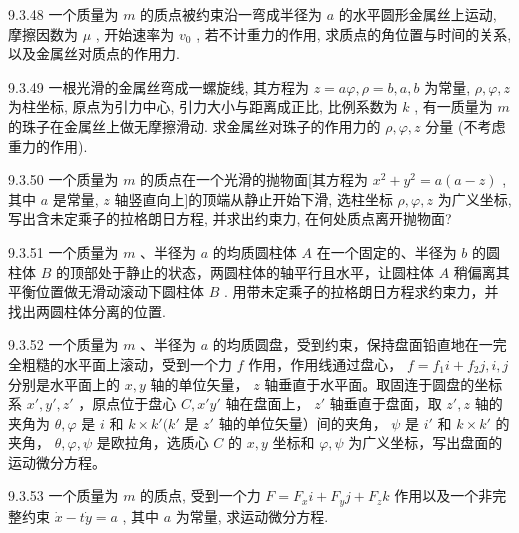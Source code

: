 \begin{problem}{9.3.48}
一个质量为 $m$ 的质点被约束沿一弯成半径为 $a$ 的水平圆形金属丝上运动, 摩擦因数为 $\mu$ , 开始速率为 $v_{0}$ , 若不计重力的作用, 求质点的角位置与时间的关系, 以及金属丝对质点的作用力.
\end{problem}
\clearpage


\begin{problem}{9.3.49}
一根光滑的金属丝弯成一螺旋线, 其方程为 $z = a\varphi, \rho = b, a, b$ 为常量, $\rho, \varphi, z$ 为柱坐标, 原点为引力中心, 引力大小与距离成正比, 比例系数为 $k$ , 有一质量为 $m$ 的珠子在金属丝上做无摩擦滑动. 求金属丝对珠子的作用力的 $\rho, \varphi, z$ 分量 (不考虑重力的作用).
\end{problem}
\clearpage


\begin{problem}{9.3.50}
一个质量为 $m$ 的质点在一个光滑的抛物面[其方程为 $x^{2} + y^{2} = a(a - z)$ , 其中 $a$ 是常量, $z$ 轴竖直向上]的顶端从静止开始下滑, 选柱坐标 $\rho, \varphi, z$ 为广义坐标, 写出含未定乘子的拉格朗日方程, 并求出约束力, 在何处质点离开抛物面?
\end{problem}
\clearpage


\begin{problem}{9.3.51}
一个质量为 $m$ 、半径为 $a$ 的均质圆柱体 $A$ 在一个固定的、半径为 $b$ 的圆柱体 $B$ 的顶部处于静止的状态，两圆柱体的轴平行且水平，让圆柱体 $A$ 稍偏离其平衡位置做无滑动滚动下圆柱体 $B$ . 用带未定乘子的拉格朗日方程求约束力，并找出两圆柱体分离的位置.
\end{problem}
\clearpage


\begin{problem}{9.3.52}
一个质量为 $m$ 、半径为 $a$ 的均质圆盘，受到约束，保持盘面铅直地在一完全粗糙的水平面上滚动，受到一个力 $f$ 作用，作用线通过盘心， $f = f_{1}i + f_{2}j, i, j$ 分别是水平面上的 $x, y$ 轴的单位矢量， $z$ 轴垂直于水平面。取固连于圆盘的坐标系 $x', y', z'$ ，原点位于盘心 $C, x'y'$ 轴在盘面上， $z'$ 轴垂直于盘面，取 $z', z$ 轴的夹角为 $\theta, \varphi$ 是 $i$ 和 $k \times k'(k'$ 是 $z'$ 轴的单位矢量）间的夹角， $\psi$ 是 $i'$ 和 $k \times k'$ 的夹角， $\theta, \varphi, \psi$ 是欧拉角，选质心 $C$ 的 $x, y$ 坐标和 $\varphi, \psi$ 为广义坐标，写出盘面的运动微分方程。
\end{problem}
\clearpage


\begin{problem}{9.3.53}
一个质量为 $m$ 的质点, 受到一个力 $F = F_{x}i + F_{y}j + F_{z}k$ 作用以及一个非完整约束 $\dot{x} - t\dot{y} = a$ , 其中 $a$ 为常量, 求运动微分方程.
\end{problem}
\clearpage


